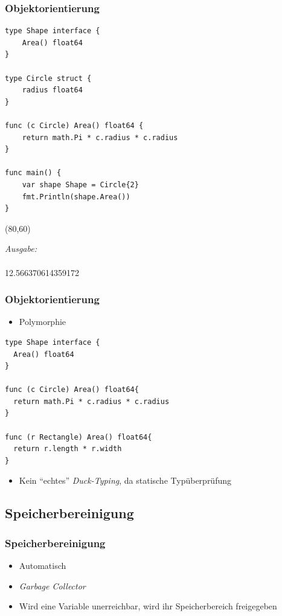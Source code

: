 \documentclass{beamer}
\begin{document}
\begin{frame}[fragile]
\frametitle{Objektorientierung}

\begin{lstlisting}
type Shape interface {
    Area() float64
}

type Circle struct {
    radius float64
}

func (c Circle) Area() float64 {
	return math.Pi * c.radius * c.radius
}

func main() {
    var shape Shape = Circle{2}
    fmt.Println(shape.Area())
}
\end{lstlisting}

\begin{textblock}{42}(80,60)
\begin{tcolorbox}
\textit{Ausgabe:\\}\\
12.566370614359172
\end{tcolorbox}
\end{textblock}

\end{frame}

\begin{frame}[fragile]
\frametitle{Objektorientierung}

\begin{itemize}
\item Polymorphie
\end{itemize}

\begin{lstlisting}
type Shape interface {
  Area() float64
}

func (c Circle) Area() float64{
  return math.Pi * c.radius * c.radius
}

func (r Rectangle) Area() float64{
  return r.length * r.width
}
\end{lstlisting}

\begin{itemize}
\setlength{\itemsep}{24pt}
\item Kein ``echtes'' \textit{Duck-Typing}, da statische Typ\"uberpr\"ufung
\end{itemize}

\end{frame}


\subsection{Speicherbereinigung}
\begin{frame}
\frametitle{Speicherbereinigung}

\begin{itemize}
\setlength{\itemsep}{30pt}
\item Automatisch
\item \textit{Garbage Collector}
\item Wird eine Variable unerreichbar, wird ihr Speicherbereich freigegeben
\end{itemize}

\end{frame}
\end{document}
